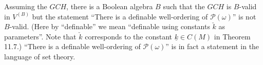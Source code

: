 Assuming the $GCH$, there is a Boolean algebra $B$ such that the $GCH$ is $B$-valid in $V^{(B)}$ but the statement ``There is a definable well-ordering of $\mathcal{P}(\omega)$'' is not $B$-valid. (Here by ``definable'' we mean ``definable using constants $\check{k}$ as parameters''. Note that $\check{k}$ corresponds to the constant $\underline{k} \in C(M)$ in Theorem 11.7.) ``There is a definable well-ordering of $\mathcal{P}(\omega)$'' is in fact a statement in the language of set theory.
